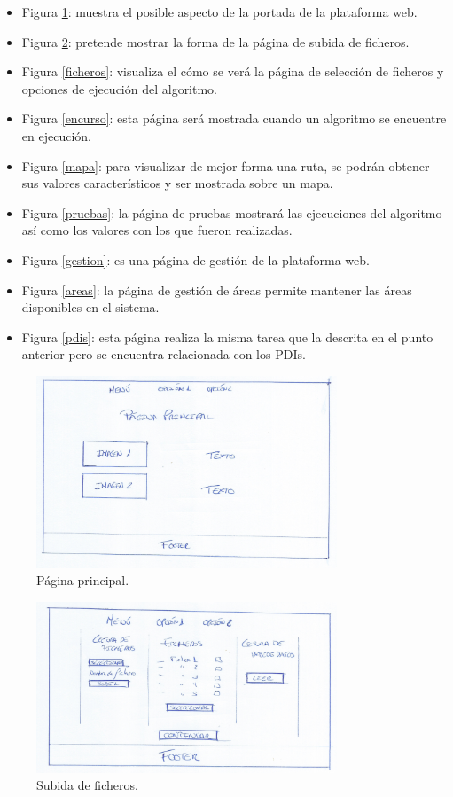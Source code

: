 \begin{itemize}
	\item Figura \ref{principal}: muestra el posible aspecto de la portada de la plataforma web.
	\item Figura \ref{subida}: pretende mostrar la forma de la página de subida de ficheros.
	\item Figura \ref{ficheros}: visualiza el cómo se verá la página de selección de ficheros y opciones de ejecución del algoritmo.
	\item Figura \ref{encurso}: esta página será mostrada cuando un algoritmo se encuentre en ejecución.
	\item Figura \ref{mapa}: para visualizar de mejor forma una ruta, se podrán obtener sus valores característicos y ser mostrada sobre un mapa.
	\item Figura \ref{pruebas}: la página de pruebas mostrará las ejecuciones del algoritmo así como los valores con los que fueron realizadas.
	\item Figura \ref{gestion}: es una página de gestión de la plataforma web.
	\item Figura \ref{areas}: la página de gestión de áreas permite mantener las áreas disponibles en el sistema.
	\item Figura \ref{pdis}: esta página realiza la misma tarea que la descrita en el punto anterior pero se encuentra relacionada con los PDIs.
\end{itemize}

\begin{figure}[!htbp]
  \centering
    \includegraphics[width=0.8\textwidth]{../img/prototipado/baja/principal.png}
  \caption{Página principal.}
  \label{principal}
\end{figure}

\begin{figure}[!htbp]
  \centering
    \includegraphics[width=0.8\textwidth]{../img/prototipado/baja/subida.png}
  \caption{Subida de ficheros.}
  \label{subida}
\end{figure}

